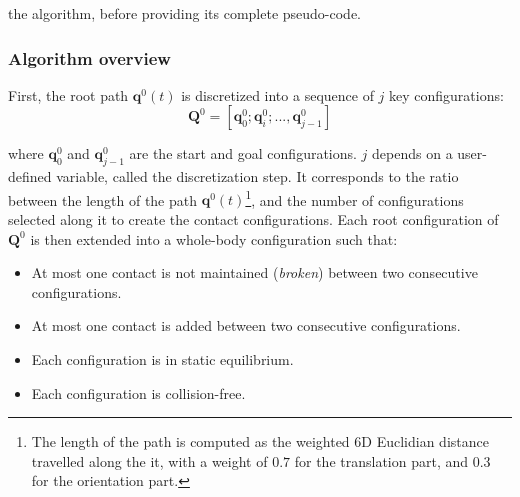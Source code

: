 \documentclass[journal]{IEEEtran}
\providecommand{\DIFaddtex}[1]{#1} %
\providecommand{\DIFaddbegin}{\protect\color{blue}} %
\providecommand{\DIFaddend}{\protect\color{black}} %
\providecommand{\DIFdelend}{} %
\providecommand{\DIFadd}[1]{\texorpdfstring{\DIFaddtex{#1}}{#1}} %
\begin{document}
\DIFdelend \DIFaddbegin \DIFadd{the algorithm, before providing its complete pseudo-code.
}\subsubsection{\DIFadd{Algorithm overview}}
\DIFaddend First, the root path $\mathbf{q}^0(t)$ is discretized into a sequence of $j$ key configurations:  
\begin{equation*}
	\mathbf{Q}^0 = [\mathbf{q}^0_{0}; \mathbf{q}^0_{i}; ..., \mathbf{q}^0_{j-1}]
\end{equation*} 
\DIFaddbegin 

\DIFaddend where $\mathbf{q}^0_{0}$ and $\mathbf{q}^0_{j-1}$ are the start and goal configurations. %
\DIFaddbegin \DIFadd{$j$ depends on a user-defined variable, called the discretization step. It corresponds to the ratio between the length of the path $\mathbf{q}^0(t)$}\footnote{\DIFadd{The length of the path is computed as the weighted 6D Euclidian distance
travelled along the it, with a weight of $0.7$ for the translation part, and $0.3$ for the orientation part.}}\DIFadd{, and the number
of configurations selected along it to create the contact configurations. 
}\DIFaddend Each root configuration of $\mathbf{Q}^0$ is then extended into a whole-body configuration such that:
\begin{itemize} 
\item At most one contact is not maintained (\textit{broken}) between two consecutive configurations.
\item At most one contact is added between two consecutive configurations.
\item Each configuration is in static equilibrium.
\item Each configuration is collision-free.
\end{itemize} 


\end{document}
